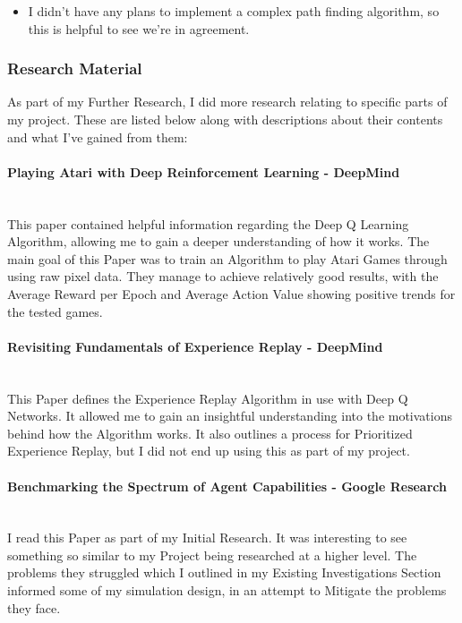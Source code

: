 \begin{flushleft}
\begin{itemize}
                    \item I didn't have any plans to implement a complex path finding algorithm, so this is helpful to see we're in agreement.

                \end{itemize}
            \subsubsection{Research Material}
                As part of my Further Research, I did more research relating to specific parts of my project. These are listed below along with 
                descriptions about their contents and what I've gained from them:
                
                \paragraph*{Playing Atari with Deep Reinforcement Learning - DeepMind} \mbox{} \\
                    This paper contained helpful information regarding the Deep Q Learning Algorithm, allowing me to gain a deeper understanding
                    of how it works. The main goal of this Paper was to train an Algorithm to play Atari Games through using raw pixel data. They
                    manage to achieve relatively good results, with the Average Reward per Epoch and Average Action Value showing positive
                    trends for the tested games.

                \paragraph*{Revisiting Fundamentals of Experience Replay - DeepMind} \mbox{} \\        
                    This Paper defines the Experience Replay Algorithm in use with Deep Q Networks. It allowed me to gain an insightful understanding
                    into the motivations behind how the Algorithm works. It also outlines a process for Prioritized Experience Replay, but I did not
                    end up using this as part of my project.

                \paragraph*{Benchmarking the Spectrum of Agent Capabilities - Google Research} \mbox{} \\
                    I read this Paper as part of my Initial Research. It was interesting to see something so similar to my Project being researched
                    at a higher level. The problems they struggled which I outlined in my Existing Investigations Section informed some of my simulation
                    design, in an attempt to Mitigate the problems they face.


\end{flushleft}

